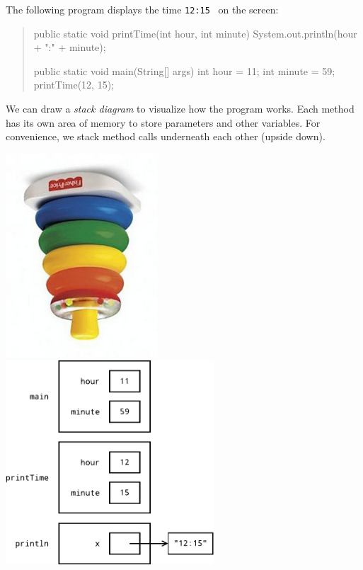 
The following program displays the time \verb|12:15|~ on the screen:

\begin{quote}

\begin{javalst}
public static void printTime(int hour, int minute) {
    System.out.println(hour + ":" + minute);
}

public static void main(String[] args) {
    int hour = 11;
    int minute = 59;
    printTime(12, 15);
}
\end{javalst}
\end{quote}

We can draw a \emph{stack diagram} to visualize how the program works.
Each method has its own area of memory to store parameters and other variables.
For convenience, we stack method calls underneath each other (upside down).

\begin{center}
\includegraphics[height=3in]{stack-rings1.png}
\hspace{1em}
\includegraphics[height=3in]{stack1.pdf}
\end{center}


